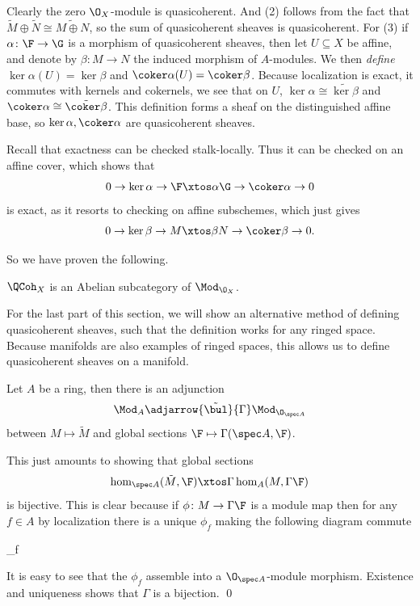 Clearly the zero $\O_X$-module is quasicoherent.
And (2) follows from the fact that $\tilde M\oplus\tilde N\cong\tilde{M\oplus N}$, so the sum of quasicoherent sheaves is quasicoherent.
For (3) if $\alpha\colon\F\to\G$ is a morphism of quasicoherent sheaves, then let $U\subseteq X$ be affine, and denote by $\beta\colon M\to N$ the induced morphism of $A$-modules.
We then {\it define\/} $\ker\alpha(U)=\ker\beta$ and $\coker\alpha(U)=\coker\beta$.
Because localization is exact, it commutes with kernels and cokernels, we see that on $U$, $\ker\alpha\cong\tilde{\ker\beta}$ and $\coker\alpha\cong\tilde{\coker\beta}$.
This definition forms a sheaf on the distinguished affine base, so $\ker\alpha,\coker\alpha$ are quasicoherent sheaves.

Recall that exactness can be checked stalk-locally.
Thus it can be checked on an affine cover, which shows that
$$ 0 \to \ker\alpha \to \F \xtos\alpha \G \to \coker\alpha \to 0 $$
is exact, as it resorts to checking on affine subschemes, which just gives
$$ 0 \to \ker\beta \to M \xtos\beta N \to \coker\beta \to 0 . $$

So we have proven the following.

\bthrm

    $\QCoh_X$ is an Abelian subcategory of $\Mod_{\O_X}$.

\ethrm

For the last part of this section, we will show an alternative method of defining quasicoherent sheaves, such that the definition works for any ringed space.
Because manifolds are also examples of ringed spaces, this allows us to define quasicoherent sheaves on a manifold.

\bprop

    Let $A$ be a ring, then there is an adjunction
    $$ \Mod_A \adjarrow{\tilde\bul}{\Gamma} \Mod_{\O_{\spec A}} $$
    between $M\mapsto\tilde M$ and global sections $\F\mapsto\Gamma(\spec A,\F)$.

\eprop

\bproof

    This just amounts to showing that global sections
    $$ \hom_{\spec A}(\tilde M,\F) \xtos\Gamma \hom_A(M,\Gamma\F) $$
    is bijective.
    This is clear because if $\phi\colon M\to\Gamma\F$ is a module map then for any $f\in A$ by localization there is a unique $\phi_f$ making the following diagram commute

        {\phi}{\phi_f}{}{}

    It is easy to see that the $\phi_f$ assemble into a $\O_{\spec A}$-module morphism.
    Existence and uniqueness shows that $\Gamma$ is a bijection.
    \qed

